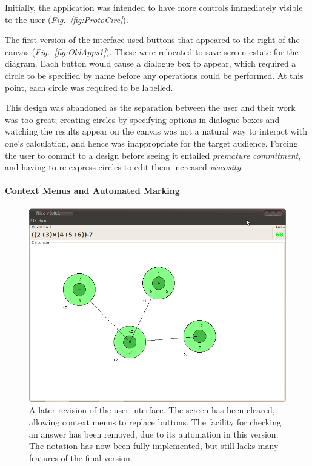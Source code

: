 \documentclass[12pt,twoside,notitlepage,xetex]{report}
\begin{document}
Initially, the application was intended to have more controls immediately visible to the user (\emph{Fig.~\ref{fig:ProtoCirc}}).

The first version of the interface used buttons that appeared to the right of the canvas (\emph{Fig.~\ref{fig:OldApps1}}).  These were relocated to save screen-estate for the diagram.  Each button would cause a dialogue box to appear, which required a circle to be specified by name before any operations could be performed.  At this point, each circle was required to be labelled.

This design was abandoned as the separation between the user and their work was too great; creating circles by specifying options in dialogue boxes and watching the results appear on the canvas was not a natural way to interact with one's calculation, and hence was inappropriate for the target audience.  Forcing the user to commit to a design before seeing it entailed \emph{premature commitment}, and having to re-express circles to edit them increased \emph{viscosity}.

\paragraph{Context Menus and Automated Marking}\hfill

\begin{center}
\begin{figure}[H]
\begin{center}
\includegraphics[width=\textwidth-4cm]{figs/nico_screen_older.png}
\end{center}
\caption{A later revision of the user interface.  The screen has been cleared, allowing context menus to replace buttons.  The facility for checking an answer has been removed, due to its automation in this version.  The notation has now been fully implemented, but still lacks many features of the final version.}
\label{fig:OldApps2}
\end{figure}
\end{center}
\end{document}
